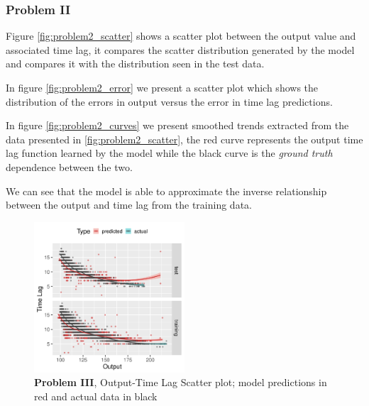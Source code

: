 \documentclass[envcountsect,runningheads]{llncs}
\theoremstyle{etoile}
\begin{document}
\subsubsection{Problem II}

Figure \ref{fig:problem2_scatter} shows a scatter plot between the output value and associated 
time lag, it compares the scatter distribution generated by the model and compares it with the 
distribution seen in the test data.

In figure \ref{fig:problem2_error} we present a scatter plot which shows the distribution of the 
errors in output versus the error in time lag predictions.

In figure \ref{fig:problem2_curves} we present smoothed trends extracted from the data presented in 
\ref{fig:problem2_scatter}, the red curve represents the output time lag function learned by the model 
while the black curve is the \emph{ground truth} dependence between the two. 

We can see that the model is able to approximate the inverse relationship between the output and 
time lag from the training data.

\begin{figure}[h]
\vspace{.3in}
\centerline{\includegraphics[width=0.5\textwidth]{figures/exp3_scatter_v_tl.png}}
\vspace{.3in}
\caption{\textbf{Problem III}, Output-Time Lag Scatter plot; model predictions in red and actual data in black}
\label{fig:problem3_scatter}
\end{figure}
\end{document}
